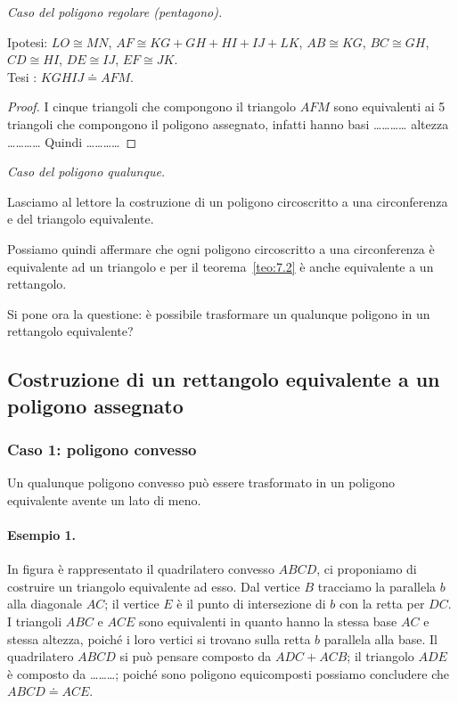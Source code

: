\noindent \emph{Caso del poligono regolare (pentagono).}\vspace{10pt}

\noindent Ipotesi: $LO\cong MN$, $AF\cong KG+GH+HI+IJ+LK$, $AB\cong KG$, $BC\cong GH$, $CD\cong HI$, $DE\cong IJ$, $EF\cong JK$.\\
Tesi : $KGHIJ\doteq AFM$.

\begin{proof}
I cinque triangoli che compongono il triangolo $AFM$ sono equivalenti ai 5 triangoli che compongono il poligono assegnato, infatti hanno basi \ldots\ldots\ldots\ldots{} altezza \ldots\ldots\ldots\ldots{} 
Quindi \ldots\ldots\ldots\ldots{}
\end{proof}\vspace{10pt}

\noindent \emph{Caso del poligono qualunque.}\vspace{10pt}

\noindent Lasciamo al lettore la costruzione di un poligono circoscritto a una circonferenza e del triangolo equivalente.\vspace{10pt}

Possiamo quindi affermare che ogni poligono circoscritto a una circonferenza è equivalente ad un triangolo e per il teorema~\ref{teo:7.2} è anche equivalente a un rettangolo.

Si pone ora la questione: è possibile trasformare un qualunque poligono in un rettangolo equivalente?

\subsection{Costruzione di un rettangolo equivalente a un poligono assegnato}

\subsubsection{Caso 1: poligono convesso}
Un qualunque poligono convesso può essere trasformato in un poligono equivalente avente un lato di meno.

\paragraph{Esempio 1.}
In figura è rappresentato il quadrilatero convesso $ABCD$, ci proponiamo di costruire un triangolo equivalente ad esso. Dal vertice $B$ tracciamo la parallela $b$ alla diagonale $AC$; il vertice $E$ è il punto di intersezione di $b$ con la retta per $DC$. I triangoli $ABC$ e $ACE$ sono equivalenti in quanto hanno la stessa base $AC$ e stessa altezza, poiché i loro vertici si trovano sulla retta $b$ parallela alla base. Il quadrilatero $ABCD$ si può pensare composto da $ADC + ACB$; il triangolo $ADE$ è composto da \ldots\ldots\ldots{}; poiché sono poligono equicomposti possiamo concludere che $ABCD\doteq ACE$.

